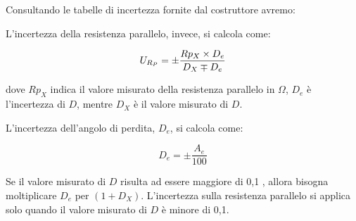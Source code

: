 Consultando le tabelle di incertezza fornite dal costruttore avremo:

\begin{table}[H]
\centering
{}
\caption{Tabella di incertezza fornita dal costruttore, con Uz l'incertezza}
\label{tab:lcr_c_sheet}
\end{table}
\FloatBarrier

L’incertezza della resistenza parallelo, invece, si calcola come:

\begin{equation}
        U_{R_P} = \pm \frac{Rp_X \times D_e}{D_X \mp D_e}  \\
\end{equation}

dove $Rp_X$ indica il valore misurato della resistenza parallelo in $\Omega$, $D_e$ è l’incertezza di 
$D$, mentre $D_X$ è il valore misurato di $D$.

L’incertezza dell’angolo di perdita, $D_e$, si calcola come:

\begin{equation}
    D_e = \pm \frac{A_e}{100}
\end{equation}

Se il valore misurato di $D$ risulta ad essere maggiore di 0,1 , allora bisogna 
moltiplicare $D_e$ per $(1+D_X)$. L’incertezza sulla resistenza parallelo si applica solo 
quando il valore misurato di $D$ è minore di 0,1.

